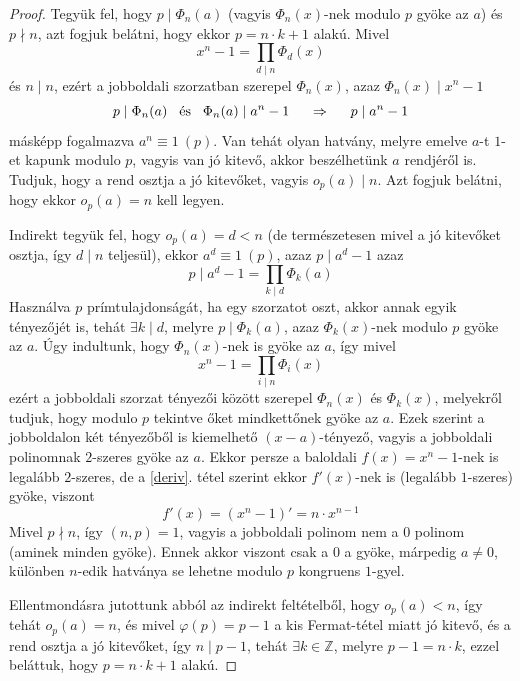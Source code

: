 \documentclass[12pt]{book}
\theoremstyle{plain} %
\theoremstyle{definition} %
\theoremstyle{remark}
\numberwithin{equation}{section}  %
\def\Z{\mathbb{Z}}
\begin{document}
	\begin{proof}
		Tegyük fel, hogy $p\mid \Phi_n(a)$ (vagyis $\Phi_n(x)$-nek modulo $p$ gyöke az $a$) és $p\nmid n$, azt fogjuk belátni, hogy ekkor $p = n\cdot k+1$ alakú. Mivel
		\[ x^n - 1 = \prod_{d\mid n} \Phi_d(x)  \]
		és $n\mid n$, ezért a jobboldali szorzatban szerepel $\Phi_n(x)$, azaz $\Phi_n(x)\mid x^n-1$
		\[ p\mid \Phi_n(a) \hspace{3mm} \text{és} \hspace{3mm} \Phi_n(a) \mid a^n - 1 \hspace{5mm} \Rightarrow \hspace{5mm} p\mid a^n - 1 \]
		másképp fogalmazva $a^n \equiv 1\ (p)$. Van tehát olyan hatvány, melyre emelve $a$-t $1$-et kapunk modulo $p$, vagyis van jó kitevő, akkor beszélhetünk $a$ rendjéről is. Tudjuk, hogy a rend osztja a jó kitevőket, vagyis $o_p(a)\mid n$. Azt fogjuk belátni, hogy ekkor $o_p(a) = n$ kell legyen.
		
		Indirekt tegyük fel, hogy $o_p(a) = d<n$ (de természetesen mivel a jó kitevőket osztja, így $d\mid n$ teljesül), ekkor $a^d \equiv 1\ (p)$, azaz $p\mid a^d - 1$ azaz 
		\[ p \mid a^d - 1 = \prod_{k\mid d} \Phi_k(a)   \]
		Használva $p$ prímtulajdonságát, ha egy szorzatot oszt, akkor annak egyik tényezőjét is, tehát $\exists k\mid d$, melyre $p\mid \Phi_k(a)$, azaz $\Phi_k(x)$-nek modulo $p$ gyöke az $a$. Úgy indultunk, hogy $\Phi_n(x)$-nek is gyöke az $a$, így mivel 
		\[ x^n - 1 = \prod_{i\mid n} \Phi_i(x)  \]
		ezért a jobboldali szorzat tényezői között szerepel $\Phi_n(x)$ és $\Phi_k(x)$, melyekről tudjuk, hogy modulo $p$ tekintve őket mindkettőnek gyöke az $a$. Ezek szerint a jobboldalon két tényezőből is kiemelhető $(x-a)$-tényező, vagyis a jobboldali polinomnak $2$-szeres gyöke az $a$. Ekkor persze a baloldali $f(x)=x^n-1$-nek is legalább $2$-szeres, de a \ref{deriv}. tétel szerint ekkor $f'(x)$-nek is (legalább $1$-szeres) gyöke, viszont
		\[ f'(x) =  (x^n-1)' = n\cdot x^{n-1}  \]
		Mivel $p\nmid n$, így $(n,p)=1$, vagyis a jobboldali polinom nem a $0$ polinom (aminek minden gyöke). Ennek akkor viszont csak a $0$ a gyöke, márpedig $a\neq 0$, különben $n$-edik hatványa se lehetne modulo $p$ kongruens $1$-gyel.
		
		Ellentmondásra jutottunk abból az indirekt feltételből, hogy $o_p(a)<n$, így tehát $o_p(a) = n$, és mivel $\varphi(p) = p-1$ a kis Fermat-tétel miatt jó kitevő, és a rend osztja a jó kitevőket, így $n\mid p-1$, tehát $\exists k\in \Z$, melyre $p-1= n\cdot k$, ezzel beláttuk, hogy $p=n\cdot k + 1$ alakú.
	\end{proof}
	
\end{document}
